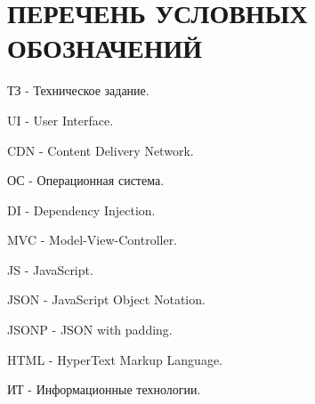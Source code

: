 \section*{ПЕРЕЧЕНЬ УСЛОВНЫХ ОБОЗНАЧЕНИЙ}

ТЗ - Техническое задание.

UI - User Interface.

CDN - Content Delivery Network.

ОС - Операционная система.

DI - Dependency Injection.

MVC - Model-View-Controller.

JS - JavaScript.

JSON - JavaScript Object Notation.

JSONP - JSON with padding.

HTML - HyperText Markup Language.

ИТ - Информационные технологии.

